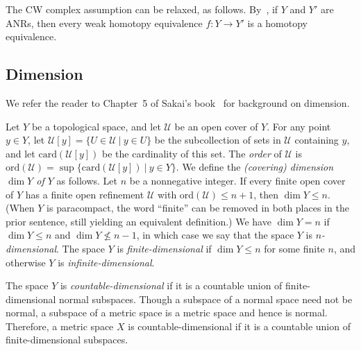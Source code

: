 \documentclass[11pt, reqno, english]{amsart}
\theoremstyle{plain}
\theoremstyle{definition}
\theoremstyle{myremark}
\newcommand{\cU}{\mathcal{U}}
\newcommand{\ord}{\mathrm{ord}}
\newcommand{\card}{\mathrm{card}}
\newcommand{\note}[1]{\textcolor{blue}{({#1})}}
\begin{document}
The CW complex assumption can be relaxed, as follows.
By~\cite[Corollary~6.6.6]{sakai2013geometric}, if $Y$ and $Y'$ are ANRs, then every weak homotopy equivalence $f\colon Y\to Y'$ is a homotopy equivalence.



\subsection{Dimension}

We refer the reader to Chapter~5 of Sakai's book~\cite{sakai2013geometric} for background on dimension.

Let $Y$ be a topological space, and let $\cU$ be an open cover of $Y$.
For any point $y\in Y$, let $\cU[y]=\{U\in\cU~|~y\in U\}$ be the subcollection of sets in $\cU$ containing $y$, and let $\card(\cU[y])$ be the cardinality of this set.
The \emph{order} of $\cU$ is $\ord(\cU)=\sup\{\card(\cU[y])~|~y\in Y\}$.
We define the \emph{(covering) dimension $\dim Y$ of $Y$} as follows.
Let $n$ be a nonnegative integer.
If every finite open cover of $Y$ has a finite open refinement $\cU$ with $\ord(\cU)\le n+1$, then $\dim Y\le n$.
(When $Y$ is paracompact, the word ``finite'' can be removed in both places in the prior sentence, still yielding an equivalent definition.)
We have $\dim Y=n$ if $\dim Y\le n$ and $\dim Y\nleq n-1$, in which case we say that the space $Y$ is \emph{$n$-dimensional}.
The space $Y$ is \emph{finite-dimensional} if $\dim Y\le n$ for some finite $n$, and otherwise $Y$ is \emph{infinite-dimensional}.

The space $Y$ is \emph{countable-dimensional} if it is a countable union of finite-dimensional normal subspaces.
Though a subspace of a normal space need not be normal, a subspace of a metric space is a metric space and hence is normal.
Therefore, a metric space $X$ is countable-dimensional if it is a countable union of finite-dimensional subspaces.
\end{document}
